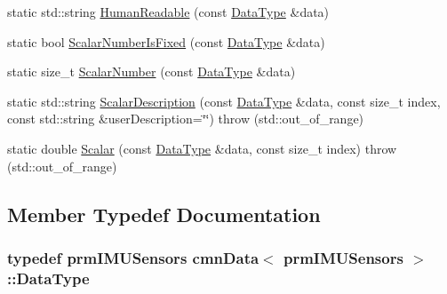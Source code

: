 \begin{DoxyCompactItemize}
\item 
static std\+::string \hyperlink{classcmn_data_3_01prm_i_m_u_sensors_01_4_a842e65b813b5d0d901950cbb054f446f}{Human\+Readable} (const \hyperlink{classcmn_data_3_01prm_i_m_u_sensors_01_4_a194688d7b45dc5a5b01771de9484c432}{Data\+Type} \&data)
\item 
static bool \hyperlink{classcmn_data_3_01prm_i_m_u_sensors_01_4_af9a19077622d0ae8815de55f733cecc7}{Scalar\+Number\+Is\+Fixed} (const \hyperlink{classcmn_data_3_01prm_i_m_u_sensors_01_4_a194688d7b45dc5a5b01771de9484c432}{Data\+Type} \&data)
\item 
static size\+\_\+t \hyperlink{classcmn_data_3_01prm_i_m_u_sensors_01_4_a8071620fa877d3dee6b6282c6b449901}{Scalar\+Number} (const \hyperlink{classcmn_data_3_01prm_i_m_u_sensors_01_4_a194688d7b45dc5a5b01771de9484c432}{Data\+Type} \&data)
\item 
static std\+::string \hyperlink{classcmn_data_3_01prm_i_m_u_sensors_01_4_a7ac6d308f941e043f26053dbae1eeca7}{Scalar\+Description} (const \hyperlink{classcmn_data_3_01prm_i_m_u_sensors_01_4_a194688d7b45dc5a5b01771de9484c432}{Data\+Type} \&data, const size\+\_\+t index, const std\+::string \&user\+Description=\char`\"{}\char`\"{})  throw (std\+::out\+\_\+of\+\_\+range)
\item 
static double \hyperlink{classcmn_data_3_01prm_i_m_u_sensors_01_4_aa5fe64d57d9a5695a8d568461e78faac}{Scalar} (const \hyperlink{classcmn_data_3_01prm_i_m_u_sensors_01_4_a194688d7b45dc5a5b01771de9484c432}{Data\+Type} \&data, const size\+\_\+t index)  throw (std\+::out\+\_\+of\+\_\+range)
\end{DoxyCompactItemize}


\subsection{Member Typedef Documentation}
\hypertarget{classcmn_data_3_01prm_i_m_u_sensors_01_4_a194688d7b45dc5a5b01771de9484c432}{}
\subsubsection[{Data\+Type}]{\setlength{\rightskip}{0pt plus 5cm}typedef {\bf prm\+I\+M\+U\+Sensors} {\bf cmn\+Data}$<$ {\bf prm\+I\+M\+U\+Sensors} $>$\+::{\bf Data\+Type}}\label{classcmn_data_3_01prm_i_m_u_sensors_01_4_a194688d7b45dc5a5b01771de9484c432}


